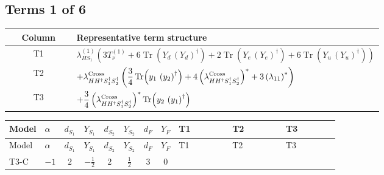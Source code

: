 \documentclass[8pt]{article}
\begin{document}
\begin{landscape}
\subsection*{Terms 1 of 6}
\begin{center}
\begin{tabular}{@{}c >{\raggedright\arraybackslash}p{0.82\linewidth}@{}}
\toprule
Column & Representative term structure \\
\midrule
T1 & \(\displaystyle {\lambda_{HS_1}^{(1)}} (3 T_{\nu}^{(1)}+6 \operatorname{Tr}\!\left({Y_d}\,\left({Y_d}\right)^{\dagger}\right)+2 \operatorname{Tr}\!\left({Y_e}\,\left({Y_e}\right)^{\dagger}\right)+6 \operatorname{Tr}\!\left({Y_u}\,\left({Y_u}\right)^{\dagger}\right))\) \\
\midrule
T2 & \(\displaystyle +{\lambda_{H H^\dagger S_1^\dagger S_2^\dagger}^{\rm Cross}} \left(\frac{3}{4} \operatorname{Tr}\!\left({y_1}\,\left({y_2}\right)^{\dagger}\right)+4 \left({\lambda_{H H^\dagger S_1^\dagger S_2^\dagger}^{\rm Cross}}\right)^{*}+3 \left({\lambda_{11}}\right)^{*}\right)\) \\
\midrule
T3 & \(\displaystyle +\frac{3}{4} \left({\lambda_{H H^\dagger S_1^\dagger S_2^\dagger}^{\rm Cross}}\right)^{*} \operatorname{Tr}\!\left({y_2}\,\left({y_1}\right)^{\dagger}\right)\) \\
\midrule
\bottomrule
\end{tabular}
\end{center}
\smallskip
\tiny
\begin{longtable}{@{}llcccccc >{\raggedright\arraybackslash}p{0.21\linewidth} >{\raggedright\arraybackslash}p{0.21\linewidth} >{\raggedright\arraybackslash}p{0.21\linewidth}@{}}
\toprule
Model & $\alpha$ & $d_{S_1}$ & $Y_{S_1}$ & $d_{S_2}$ & $Y_{S_2}$ & $d_F$ & $Y_F$ & T1 & T2 & T3 \\
\midrule
\endfirsthead
\toprule
Model & $\alpha$ & $d_{S_1}$ & $Y_{S_1}$ & $d_{S_2}$ & $Y_{S_2}$ & $d_F$ & $Y_F$ & T1 & T2 & T3 \\
\midrule
\endhead
T3-C & $-1$ & $2$ & $-\frac{1}{2}$ & $2$ & $\frac{1}{2}$ & $3$ & $0$ & \scriptsize\adjustbox{max width=\linewidth}{$\begin{gathered} {\lambda_{HS_1}^{(1)}} (3 T_{\nu}^{(1)}+6 \operatorname{Tr}\!\left({Y_d}\,\left({Y_d}\right)^{\dagger}\right)+2 \operatorname{Tr}\!\left({Y_e}\,\left({Y_e}\right)^{\dagger}\right)+6 \operatorname{Tr}\!\left({Y_u}\,\left({Y_u}\right)^{\dagger}\right))\end{gathered}$} & \scriptsize\adjustbox{max width=\linewidth}{$\begin{gathered} +{\lambda_{H H^\dagger S_1^\dagger S_2^\dagger}^{\rm Cross}} \left(\frac{3}{4} \operatorname{Tr}\!\left({y_1}\,\left({y_2}\right)^{\dagger}\right)+4 \left({\lambda_{H H^\dagger S_1^\dagger S_2^\dagger}^{\rm Cross}}\right)^{*}+3 \left({\lambda_{11}}\right)^{*}\right)\end{gathered}$} & \scriptsize\adjustbox{max width=\linewidth}{$\begin{gathered} +\frac{3}{4} \left({\lambda_{H H^\dagger S_1^\dagger S_2^\dagger}^{\rm Cross}}\right)^{*} \operatorname{Tr}\!\left({y_2}\,\left({y_1}\right)^{\dagger}\right)\end{gathered}$} \\

\end{longtable}
\end{landscape}
\end{document}
